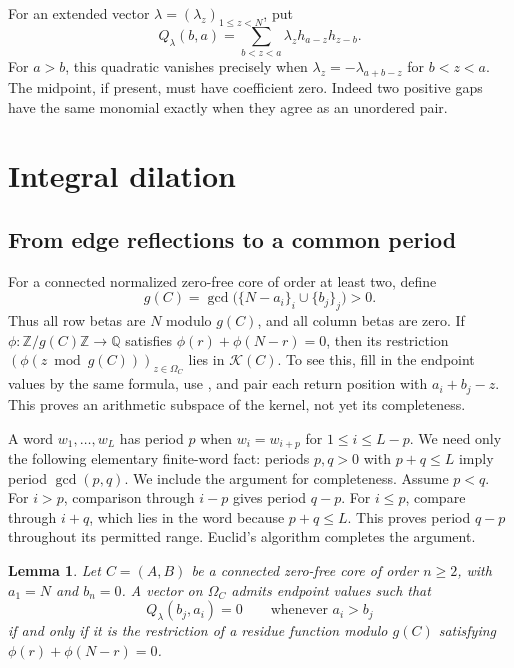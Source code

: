 \documentclass[11pt,a4paper]{amsart}
\numberwithin{equation}{section}
\theoremstyle{plain}
\newtheorem{lemma}[theorem]{Lemma}
\theoremstyle{definition}
\newcommand{\Q}{\mathbb Q}
\newcommand{\Z}{\mathbb Z}
\newcommand{\K}{\mathcal K}
\begin{document}
For an extended vector \(\lambda=(\lambda_z)_{1\le z<N}\), put
\[
 Q_\lambda(b,a)=\sum_{b<z<a}\lambda_z h_{a-z}h_{z-b}.
\]
For \(a>b\), this quadratic vanishes precisely when
\(\lambda_z=-\lambda_{a+b-z}\) for \(b<z<a\).
The midpoint, if present, must have coefficient zero.  Indeed two positive
gaps have the same monomial exactly when they agree as an unordered pair.

\section{Integral dilation}\label{sec:dilation}

\subsection{From edge reflections to a common period}

For a connected normalized zero-free core of order at least two, define
\begin{equation}\label{eq:endpoint-modulus}
 g(C)=\gcd\bigl(\{N-a_i\}_i\cup\{b_j\}_j\bigr)>0.
\end{equation}
Thus all row betas are \(N\) modulo \(g(C)\), and all column betas are zero.
If \(\phi:\Z/g(C)\Z\to\Q\) satisfies \(\phi(r)+\phi(N-r)=0\), then its
restriction \((\phi(z\bmod g(C)))_{z\in\Omega_C}\) lies in
\(\K(C)\).  To see this, fill in the endpoint values by the same formula,
use , and pair each return position with
\(a_i+b_j-z\).  This proves an arithmetic subspace of the kernel, not yet
its completeness.

A word \(w_1,\ldots,w_L\) has period \(p\) when
\(w_i=w_{i+p}\) for \(1\le i\le L-p\).
We need only the following elementary finite-word fact: periods \(p,q>0\)
with \(p+q\le L\) imply period \(\gcd(p,q)\).
We include the argument for completeness.  Assume \(p<q\).
For \(i>p\), comparison through
\(i-p\) gives period \(q-p\).  For \(i\le p\), compare through
\(i+q\), which lies in the word because \(p+q\le L\).
This proves period \(q-p\) throughout its permitted range.  Euclid's
algorithm completes the argument.

\begin{lemma}\label{lem:endpoint-normalization}
Let \(C=(A,B)\) be a connected zero-free core of order \(n\ge2\), with
\(a_1=N\) and \(b_n=0\).  A vector on \(\Omega_C\) admits endpoint values
such that
\begin{equation}\label{eq:all-edges}
 Q_\lambda(b_j,a_i)=0\qquad\text{whenever }a_i>b_j
\end{equation}
if and only if it is the restriction of a residue function modulo \(g(C)\)
satisfying \(\phi(r)+\phi(N-r)=0\).
\end{lemma}
\end{document}
